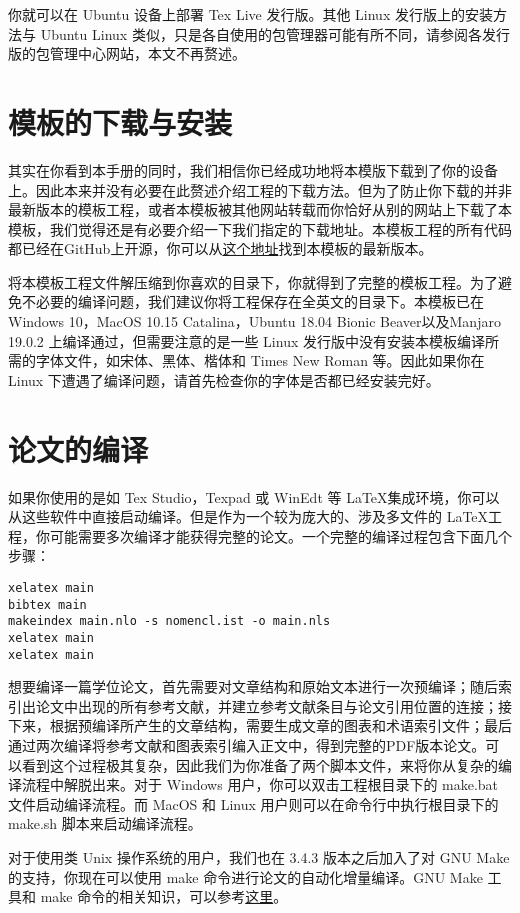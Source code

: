 \noindent 你就可以在 Ubuntu 设备上部署 Tex Live 发行版。其他 Linux 发行版上的安装方法与 Ubuntu Linux 类似，只是各自使用的包管理器可能有所不同，请参阅各发行版的包管理中心网站，本文不再赘述。

\section{模板的下载与安装}
\label{sec:template_download}

其实在你看到本手册的同时，我们相信你已经成功地将本模版下载到了你的设备上。因此本来并没有必要在此赘述介绍工程的下载方法。但为了防止你下载的并非最新版本的模板工程，或者本模板被其他网站转载而你恰好从别的网站上下载了本模板，我们觉得还是有必要介绍一下我们指定的下载地址。本模板工程的所有代码都已经在GitHub上开源，你可以从\href{https://github.com/herculas/SEU-master-thesis}{这个地址}找到本模板的最新版本。

将本模板工程文件解压缩到你喜欢的目录下，你就得到了完整的模板工程。为了避免不必要的编译问题，我们建议你将工程保存在全英文的目录下。本模板已在 Windows 10，MacOS 10.15 Catalina，Ubuntu 18.04 Bionic Beaver以及Manjaro 19.0.2 上编译通过，但需要注意的是一些 Linux 发行版中没有安装本模板编译所需的字体文件，如宋体、黑体、楷体和 Times New Roman 等。因此如果你在 Linux 下遭遇了编译问题，请首先检查你的字体是否都已经安装完好。

\section{论文的编译}
\label{sec:compilation}

如果你使用的是如 Tex Studio，Texpad 或 WinEdt 等 \LaTeX 集成环境，你可以从这些软件中直接启动编译。但是作为一个较为庞大的、涉及多文件的 \LaTeX 工程，你可能需要多次编译才能获得完整的论文。一个完整的编译过程包含下面几个步骤：

\begin{tcolorbox}
\begin{lstlisting}
xelatex main
bibtex main
makeindex main.nlo -s nomencl.ist -o main.nls
xelatex main
xelatex main
\end{lstlisting}
\end{tcolorbox}

\noindent 想要编译一篇学位论文，首先需要对文章结构和原始文本进行一次预编译；随后索引出论文中出现的所有参考文献，并建立参考文献条目与论文引用位置的连接；接下来，根据预编译所产生的文章结构，需要生成文章的图表和术语索引文件；最后通过两次编译将参考文献和图表索引编入正文中，得到完整的PDF版本论文。可以看到这个过程极其复杂，因此我们为你准备了两个脚本文件，来将你从复杂的编译流程中解脱出来。对于 Windows 用户，你可以双击工程根目录下的 make.bat 文件启动编译流程。而 MacOS 和 Linux 用户则可以在命令行中执行根目录下的 make.sh 脚本来启动编译流程。

对于使用类 Unix 操作系统的用户，我们也在 3.4.3 版本之后加入了对 GNU Make 的支持，你现在可以使用 make 命令进行论文的自动化增量编译。GNU Make 工具和 make 命令的相关知识，可以参考\href{https://www.gnu.org/software/make/manual/make.html}{这里}。

